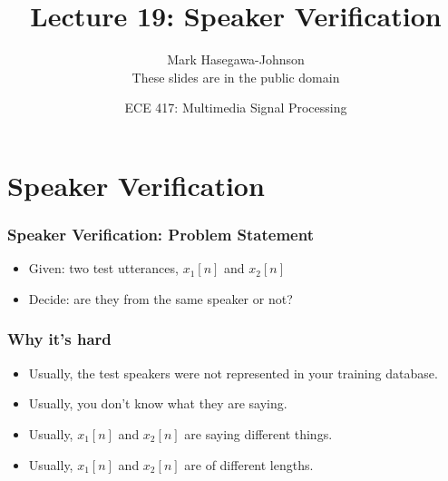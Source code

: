 \documentclass{beamer}
\title{Lecture 19: Speaker Verification}
\author{Mark Hasegawa-Johnson\\These slides are in the public domain}
\date{ECE 417: Multimedia Signal Processing}
\institute{University of Illinois}
\begin{document}
\begin{frame}
  \maketitle
\end{frame}

\begin{frame}
  \tableofcontents
\end{frame}


\section{Speaker Verification}
\setcounter{subsection}{1}

\begin{frame}
  \frametitle{Speaker Verification: Problem Statement}
  \begin{itemize}
  \item Given: two test utterances, $x_1[n]$ and $x_2[n]$
  \item Decide: are they from the same speaker or not?
  \end{itemize}
\end{frame}

\begin{frame}
  \frametitle{Why it's hard}

  \begin{itemize}
  \item Usually, the test speakers were not represented in your
    training database.
  \item Usually, you don't know what they are saying.
  \item Usually, $x_1[n]$ and $x_2[n]$ are saying different things.
  \item Usually, $x_1[n]$ and $x_2[n]$ are of different lengths.
  \end{itemize}
\end{frame}
\end{document}
